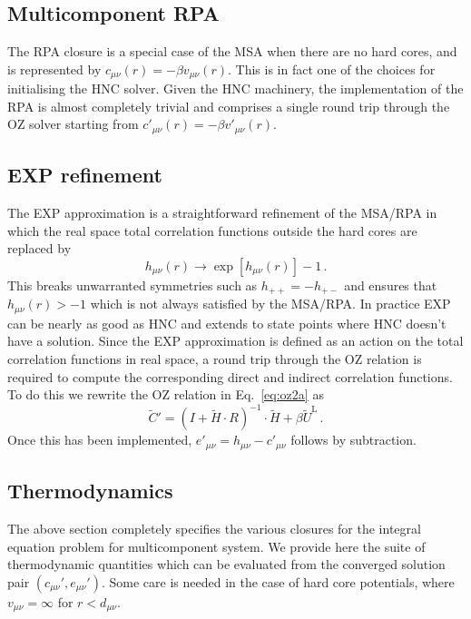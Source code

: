 \documentclass[12pt,a4paper]{article}
\newcommand{\lr}{^{\mathrm{L}}}
\newcommand{\Eqref}[1]{Eq.~\eqref{#1}}
\begin{document}
\subsection{Multicomponent RPA}\label{sec:RPA}
%
The RPA closure is a special case of the MSA when there are no hard
cores, and is represented by $c_{\mu\nu}(r)=-\beta v_{\mu\nu}(r)$.
This is in fact one of the choices for initialising the HNC solver.
Given the HNC machinery, the implementation of the RPA is almost
completely trivial and comprises a single round trip through the OZ
solver starting from $c'_{\mu\nu}(r)=-\beta v'_{\mu\nu}(r)$.

\subsection{EXP refinement}\label{sec:EXP}
%
The EXP approximation is a straightforward refinement of the MSA/RPA
in which the real space total correlation functions outside the hard
cores are replaced by
%
\begin{equation}
h_{\mu\nu}(r)\to \exp[h_{\mu\nu}(r)]-1\,.\label{eq:exp}
\end{equation}
%
This breaks unwarranted symmetries such as $h_{++}=-h_{+-}$ and
ensures that $h_{\mu\nu}(r)>-1$ which is not always satisfied by the
MSA/RPA.  In practice EXP can be nearly as good as HNC and extends to
state points where HNC doesn't have a solution.  Since the EXP
approximation is defined as an action on the total correlation
functions in real space, a round trip through the OZ relation is
required to compute the corresponding direct and indirect correlation
functions.  To do this we rewrite the OZ relation in \Eqref{eq:oz2a} as
%
\begin{equation}
{\tilde C}' = (I+{\tilde H}\cdot R)^{-1}\cdot{\tilde H}
 + \beta{\tilde U}\lr\,.
\label{eq:ozndb}
\end{equation}
%
Once this has been implemented, $e'_{\mu\nu}= h_{\mu\nu} -
c'_{\mu\nu}$ follows by subtraction.

\subsection{Thermodynamics}
\label{sec:thermo}
%
The above section completely specifies the various closures for the
integral equation problem for multicomponent system.  We provide here
the suite of thermodynamic quantities which can be evaluated from the
converged solution pair $(c_{\mu\nu}', e_{\mu\nu}')$.  Some care is
needed in the case of hard core potentials, where $v_{\mu\nu}=\infty$
for $r<d_{\mu\nu}$.
\end{document}
